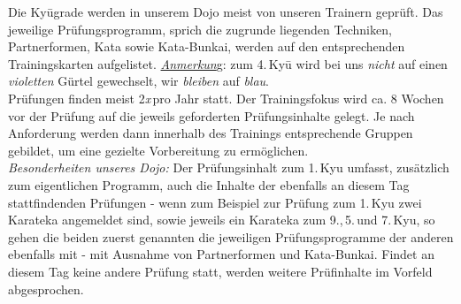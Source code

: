 \begin{center}
{\begin{center}
		\end{center}

		Die Ky\={u}grade werden in unserem Dojo meist von unseren Trainern geprüft. Das jeweilige Prüfungsprogramm, sprich die zugrunde liegenden Techniken, Partnerformen, Kata sowie Kata-Bunkai, werden auf den entsprechenden Trainingskarten aufgelistet. \textit{\underline{Anmerkun}}g: zum 4.\,Ky\={u} wird bei uns \textit{nicht} auf einen \textit{violetten} Gürtel gewechselt, wir \textit{bleiben} auf \textit{blau}.\\

		Prüfungen finden meist 2\textit{x}\,pro Jahr statt. Der Trainingsfokus wird ca. 8 Wochen vor der Prüfung auf die jeweils geforderten Prüfungsinhalte gelegt. Je nach Anforderung werden dann innerhalb des Trainings entsprechende Gruppen gebildet, um eine gezielte Vorbereitung zu ermöglichen.\\

		\textit{Besonderheiten unseres Dojo:} Der Prüfungsinhalt zum 1.\,Kyu umfasst, zusätzlich zum eigentlichen Programm, auch die Inhalte der ebenfalls an diesem Tag stattfindenden Prüfungen - wenn zum Beispiel zur Prüfung zum 1.\,Kyu zwei Karateka angemeldet sind, sowie jeweils ein Karateka zum 9.,\,5.\,und 7.\,Kyu, so gehen die beiden zuerst genannten die jeweiligen Prüfungsprogramme der anderen ebenfalls mit - mit Ausnahme von Partnerformen und Kata-Bunkai. Findet an diesem Tag keine andere Prüfung statt, werden weitere Prüfinhalte im Vorfeld abgesprochen.
	}
	\end{center}\null\vfill\null
	\setlength{\tabcolsep}{6pt}